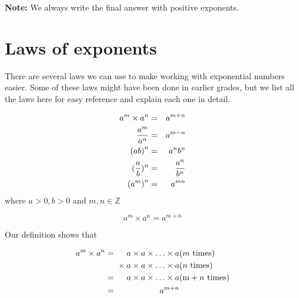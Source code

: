       
\textbf{Note:} We always write the final answer with positive exponents.







\section {Laws of exponents}
There are several laws we can use to make working with exponential numbers easier. 
Some of these laws might have been done in earlier grades, but we list all the laws here for easy reference and explain each one in detail. 


\begin{eqnarray*}
a^{m}\times a^{n}& =& a^{m+n}\hfill \\ 
\frac{a^{m}}{a^{n}}& =& a^{m-n}\hfill \\ 
{(ab)}^{n}& =& a^{n}b^{n}\hfill \\ 
        (\frac{a}{b})^n & = & \frac{a^n}{b^n} \\
{({a}^{m})}^{n}& =& a^{mn}\hfill 
\end{eqnarray*}
where $a > 0, b > 0$ and $m,n \in \mathbb{Z}$



{
$${a}^{m}\times{a}^{n}={a}^{m+n}$$

Our definition shows that

\begin{eqnarray*}
	      {a}^{m}\times{a}^{n}& =& a\times a \times \ldots \times a\hfill & (\mbox{$m$ times})\hfill \\ 
	      & & \phantom{\rule{-0.166667em}{0ex}}\phantom{\rule{-0.166667em}{0ex}}\phantom{\rule{-0.166667em}{0ex}}\phantom{\rule{-0.166667em}{0ex}}\times a \times a\times \ldots \times a\hfill & (\mbox{$n$ times})\hfill \\ 
	      & =& a\times a \times \ldots \times a\hfill & (\mathrm{m}+\mbox{$n$ times})\hfill \\ 
	      & =& {a}^{m+n}\hfill & 
\end{eqnarray*}



}


